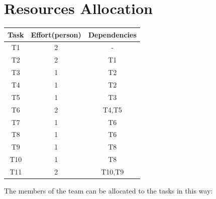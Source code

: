 \documentclass[18pt,oneside,a4paper, titlepage]{article}
\begin{document}
\newpage
\section{Resources Allocation}
	\begin{center}
		\centering
		\begin{tabular}{|c |c |c |}
			\hline \textbf{Task} & \textbf{Effort(person)} & \textbf{Dependencies} \\
			\hline		T1 & 2 & -\\
			\hline		T2 & 2 & T1\\
			\hline		T3 & 1 & T2\\
			\hline		T4 & 1 & T2\\
			\hline		T5 & 1 & T3\\
			\hline		T6 & 2 & T4,T5\\
			\hline		T7 & 1 & T6\\
			\hline		T8 & 1 & T6\\
			\hline		T9 & 1 & T8\\
			\hline		T10 & 1 & T8\\
			\hline		T11 & 2 & T10,T9\\
			\hline
		\end{tabular}
	\end{center}
	The members of the team can be allocated to the tasks in this way:
\end{document}

